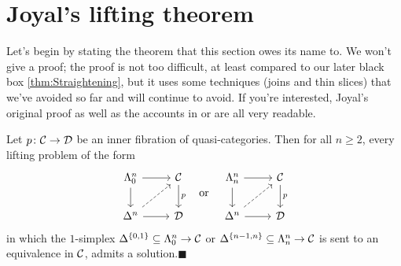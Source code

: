 \section{Joyal's lifting theorem}\label{sec:JoyalLifting}
Let's begin by stating the theorem that this section owes its name to. We won't give a proof; the proof is not too difficult, at least compared to our later black box \cref{thm:Straightening}, but it uses some techniques (joins and thin slices) that we've avoided so far and will continue to avoid. If you're interested, Joyal's original proof \cite[Theorem~\href{https://people.math.rochester.edu/faculty/doug/otherpapers/Joyal-QCKC.pdf\#page=5}{2.2}]{JoyalLifting} as well as the accounts in \cite[Theorem~2.1.8]{Land} or \cite[Tag~\href{https://kerodon.net/tag/01H0}{01H0}]{Kerodon} are all very readable.
\begin{thm}\label{thm:JoyalLifting}
	Let $p\colon \mathcal{C}\rightarrow \mathcal{D}$ be an inner fibration of quasi-categories. Then for all $n\geqslant 2$, every lifting problem of the form
	\begin{equation*}
		\begin{tikzcd}
			\Lambda_0^n\rar\dar & \Cc\dar["p"]\\
			\Delta^n\rar\urar[dashed] & \Dd
		\end{tikzcd}\quad\text{or}\quad
		\begin{tikzcd}
			\Lambda_n^n\rar\dar & \Cc\dar["p"]\\
			\Delta^n\rar\urar[dashed] & \Dd
		\end{tikzcd}
	\end{equation*}
	in which the $1$-simplex $\Delta^{\{0,1\}}\subseteq \Lambda_0^n\rightarrow\mathcal{C}$ or $\Delta^{\{n-1,n\}}\subseteq \Lambda_n^n\rightarrow\mathcal{C}$ is sent to an equivalence in $\mathcal{C}$, admits a solution.\hfill$\blacksquare$
\end{thm}

